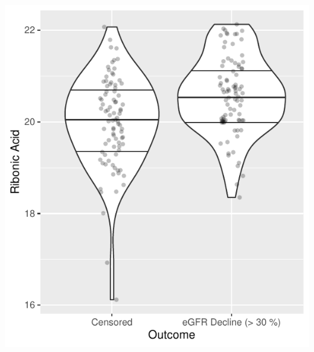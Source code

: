 \documentclass[]{article}
\begin{document}
\includegraphics{0033_PROFIL--Metabolomics_files/figure-latex/Boxplots-RA-1.pdf}
\end{document}
